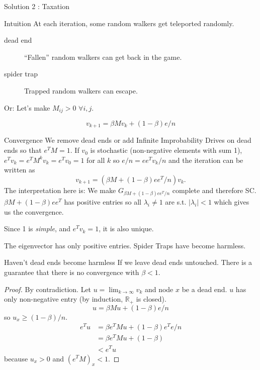 \documentclass[10pt]{beamer}
\begin{document}
\begin{frame}[allowframebreaks]{Solution 2 : Taxation}
  \begin{block}{Intuition}
    At each iteration, some random walkers get teleported randomly.
    \begin{description}
      \item[dead end] ``Fallen'' random walkers can get back in the game.
      \item[spider trap] Trapped random walkers can escape.
    \end{description}

    Or: Let's make $M_{ij} > 0$ $\forall i,j$. %
  \end{block}
  $$v_{k+1} = \beta M v_k + (1 - \beta) e/n$$
  \begin{block}{Convergence}
    We remove dead ends or add Infinite Improbability Drives on dead ends so that $e^TM = 1$.
    If $v_0$ is stochastic (non-negative elements with sum 1),
    $e^T v_k = e^TM^kv_k = e^Tv_0 = 1$ for all $k$
    so $e/n = ee^Tv_k/n$ and the iteration can be written as
    $$v_{k+1} = (\beta M + (1 - \beta) ee^T/n) v_k.$$
    The interpretation here is: We make $G_{\beta M + (1 - \beta) ee^T/n}$ complete and therefore SC.
    $\beta M + (1-\beta) ee^T$ has positive entries so all $\lambda_i \neq 1$ are s.t. $|\lambda_i| < 1$
    which gives us the convergence.

    Since 1 is \emph{simple}, and $e^T v_k = 1$, it is also unique.
  \end{block}

  The eigenvector has only positive entries.
  Spider Traps have become harmless.
  \begin{block}{Haven't dead ends become harmless}
    If we leave dead ends untouched.
    There is a guarantee that there is no convergence with $\beta < 1$.
    \begin{proof}
      By contradiction.
      Let $u = \lim_{k \to \infty} v_k$ and node $x$ be a dead end.
      $u$ has only non-negative entry (by induction, $\mathbb{R}_+$ is closed).
      $$u = \beta M u + (1 - \beta) e/n$$
      so $u_x \geq (1-\beta)/n$.
      \begin{align*}
        e^Tu & = \beta e^TM u + (1-\beta) e^Te/n\\
             & = \beta e^TM u + (1 - \beta)\\
             & < e^T u
      \end{align*}
      because $u_x > 0$ and $(e^TM)_x < 1$.
    \end{proof}
  \end{block}
\end{frame}
\end{document}
